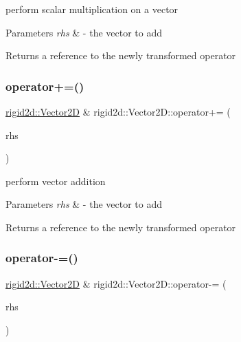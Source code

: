 perform scalar multiplication on a vector 


\begin{DoxyParams}{Parameters}
{\em rhs} & -\/ the vector to add \\
\hline
\end{DoxyParams}
\begin{DoxyReturn}{Returns}
a reference to the newly transformed operator 
\end{DoxyReturn}
\mbox{\label{structrigid2d_1_1Vector2D_a2e20ab3a7d186527955370e58df504ec}} 
\subsubsection{\texorpdfstring{operator+=()}{operator+=()}}
{\footnotesize\ttfamily \hyperlink{structrigid2d_1_1Vector2D}{rigid2d\+::\+Vector2D} \& rigid2d\+::\+Vector2\+D\+::operator+= (\begin{DoxyParamCaption}\item[{const \hyperlink{structrigid2d_1_1Vector2D}{Vector2D} \&}]{rhs }\end{DoxyParamCaption})}



perform vector addition 


\begin{DoxyParams}{Parameters}
{\em rhs} & -\/ the vector to add \\
\hline
\end{DoxyParams}
\begin{DoxyReturn}{Returns}
a reference to the newly transformed operator 
\end{DoxyReturn}
\mbox{\label{structrigid2d_1_1Vector2D_a43ee2a20c766c24809e243cebbdae224}} 
\subsubsection{\texorpdfstring{operator-\/=()}{operator-=()}}
{\footnotesize\ttfamily \hyperlink{structrigid2d_1_1Vector2D}{rigid2d\+::\+Vector2D} \& rigid2d\+::\+Vector2\+D\+::operator-\/= (\begin{DoxyParamCaption}\item[{const \hyperlink{structrigid2d_1_1Vector2D}{Vector2D} \&}]{rhs }\end{DoxyParamCaption})}




